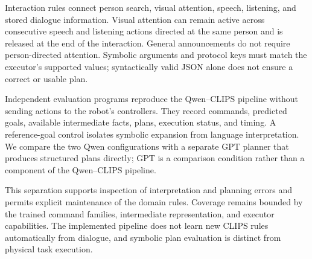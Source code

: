 Interaction rules connect person search, visual attention, speech, listening, and stored dialogue information. Visual attention can remain active across consecutive speech and listening actions directed at the same person and is released at the end of the interaction. General announcements do not require person-directed attention. Symbolic arguments and protocol keys must match the executor's supported values; syntactically valid JSON alone does not ensure a correct or usable plan.

Independent evaluation programs reproduce the Qwen--CLIPS pipeline without sending actions to the robot's controllers. They record commands, predicted goals, available intermediate facts, plans, execution status, and timing. A reference-goal control isolates symbolic expansion from language interpretation. We compare the two Qwen configurations with a separate GPT planner that produces structured plans directly; GPT is a comparison condition rather than a component of the Qwen--CLIPS pipeline.

This separation supports inspection of interpretation and planning errors and permits explicit maintenance of the domain rules. Coverage remains bounded by the trained command families, intermediate representation, and executor capabilities. The implemented pipeline does not learn new CLIPS rules automatically from dialogue, and symbolic plan evaluation is distinct from physical task execution.
